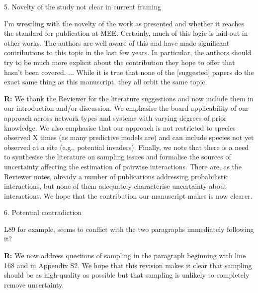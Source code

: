 \documentclass[12pt]{letter}
\newenvironment{refquote}{\bigskip \begin{it}}{\end{it}\smallskip}
\begin{document}
	5. Novelty of the study not clear in current framing


		\begin{refquote}
		I'm wrestling with the novelty of the work as presented and whether it reaches the standard for publication at MEE. Certainly, much of this logic is laid out in other works. The authors are well aware of this and have made significant contributions to this topic in the last few years. In particular, the authors should try to be much more explicit about the contribution they hope to offer that hasn't been covered. ...
		While it is true that none of the [suggested] papers do the exact same thing as this manuscript, they all	orbit the same topic. 
		\end{refquote}


		\textbf{R:} We thank the Reviewer for the literature suggestions and now include them in our introduction and/or discussion. We emphasise the board applicability of our approach across network types and systems with varying degrees of prior knowledge. We also emphasise that our approach is not restricted to species observed X times (as many predictive models are) and can include species not yet observed at a site (e.g., potential invaders). Finally, we note that there is a need to synthesise the literature on sampling issues and formalise the sources of uncertainty affecting the estimation of pairwise interactions. There are, as the Reviewer notes, already a number of publications addressing probabilistic interactions, but none of them adequately characterise uncertainty about interactions. We hope that the contribution our manuscript makes is now clearer.


	6. Potential contradiction 
 

		\begin{refquote}
		L89 for example, seems to conflict with the two paragraphs immediately following it?
		\end{refquote}


		\textbf{R:} We now address questions of sampling in the paragraph beginning with line 168 and in Appendix S2. We hope that this revision makes it clear that sampling should be as high-quality as possible but that sampling is unlikely to completely remove uncertainty.
\end{document}
